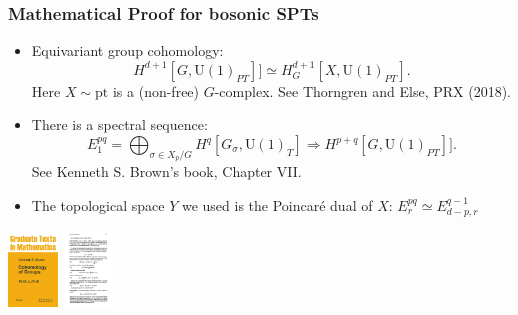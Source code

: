 \documentclass[xcolor=table, 11pt, aspectratio=1610]{beamer}
\newcommand{\uone}{\mathrm U(1)}
\begin{document}

\begin{frame}
\frametitle{Mathematical Proof for bosonic SPTs}
\begin{itemize}
\item Equivariant group cohomology:
\[H^{d+1}[G, \uone_{PT}]]\simeq H^{d+1}_G[X, \uone_{PT}].\]
Here $X\sim\text{pt}$ is a (non-free) $G$-complex. See Thorngren and Else, PRX (2018).
\item There is a spectral sequence:
\[E_1^{pq}=\bigoplus_{\sigma\in X_p/G}H^q[G_\sigma,\uone_T]\Rightarrow
 H^{p+q}[G, \uone_{PT}]].\]
See Kenneth S. Brown's book, Chapter VII.
\item The topological space $Y$ we used is the Poincar\'e dual of $X$: $E^{pq}_r\simeq E^{q-1}_{d-p,r}$
\end{itemize}
\begin{center}
	\includegraphics[height=2cm]{brown_book}
	\includegraphics[height=2cm]{brown_ss}
\end{center}
\end{frame}
\end{document}
